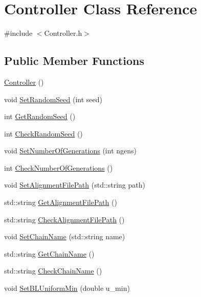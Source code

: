 \hypertarget{classController}{}\section{Controller Class Reference}
\label{classController}


{\ttfamily \#include $<$Controller.\+h$>$}

\subsection*{Public Member Functions}
\begin{DoxyCompactItemize}
\item 
\hyperlink{classController_a95c56822d667e94b031451729ce069a9}{Controller} ()
\item 
void \hyperlink{classController_a1438b54d76df7239f361bd93dfbf9246}{Set\+Random\+Seed} (int seed)
\item 
int \hyperlink{classController_acee3589ec24f9a9432c07f2fe77f005b}{Get\+Random\+Seed} ()
\item 
int \hyperlink{classController_a0a7005db27b63a01f4917134da0ae600}{Check\+Random\+Seed} ()
\item 
void \hyperlink{classController_aa42d6aa39fd621b739f2d86295e0b943}{Set\+Number\+Of\+Generations} (int ngens)
\item 
int \hyperlink{classController_a6d3e56483122b9580adef5475527a0f7}{Check\+Number\+Of\+Generations} ()
\item 
void \hyperlink{classController_a67b2357dbc00faba0f6557f3660e8711}{Set\+Alignment\+File\+Path} (std\+::string path)
\item 
std\+::string \hyperlink{classController_a5a9cf95b7410c4ca65036b8204856cd0}{Get\+Alignment\+File\+Path} ()
\item 
std\+::string \hyperlink{classController_a79fd3abba4177d597d571a97032c6432}{Check\+Alignment\+File\+Path} ()
\item 
void \hyperlink{classController_aa122ac902c36eeb2889e12558d4ad087}{Set\+Chain\+Name} (std\+::string name)
\item 
std\+::string \hyperlink{classController_a62139e7d2c85afb9046dd47528882089}{Get\+Chain\+Name} ()
\item 
std\+::string \hyperlink{classController_a207236dbade67acf265531bfa7769056}{Check\+Chain\+Name} ()
\item 
void \hyperlink{classController_ab3b26fcf8f00ea5980bf7941dc24bb0b}{Set\+B\+L\+Uniform\+Min} (double u\+\_\+min)
\item 

\end{DoxyCompactItemize}
